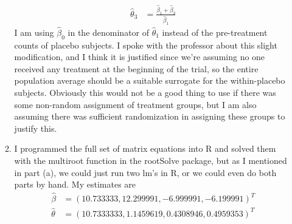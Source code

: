 \documentclass[11pt]{article}
\begin{document}
\begin{enumerate}
\begin{enumerate}
\begin{align*}
			\widehat{\theta}_3 &= \frac{\widehat{\beta}_1 + \widehat{\beta}_3}{\widehat{\beta}_1}
			\end{align*}
			I am using $\widehat{\beta}_0$ in the denominator of $\widehat{\theta}_1$ instead of the pre-treatment counts of placebo subjects. I spoke with the professor about this slight modification, and I think it is justified since we're assuming no one received any treatment at the beginning of the trial, so the entire population average should be a suitable surrogate for the within-placebo subjects. Obviously this would not be a good thing to use if there was some non-random assignment of treatment groups, but I am also assuming there was sufficient randomization in assigning these groups to justify this.
			\item I programmed the full set of matrix equations into R and solved them with the multiroot function in the rootSolve package, but as I mentioned in part (a), we could just run two lm's in R, or we could even do both parts by hand. My estimates are
			\begin{align*}
				\widehat{\beta} &= (10.733333, 12.299991, -6.999991, -6.199991)^T \\
				\widehat{\theta} &= (10.7333333,  1.1459619,  0.4308946 , 0.4959353)^T
			\end{align*}
			

\end{enumerate}
\end{enumerate}
\end{document}
